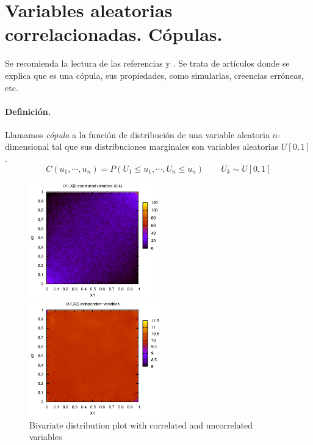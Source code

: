 \section{Variables aleatorias correlacionadas. C\'opulas.}

Se recomienda la lectura de las referencias \cite{copu:wang} y 
\cite{copu:pitfalls}. Se trata de art\'iculos donde se explica que es una 
c\'opula, sus propiedades, como simularlas, creencias err\'oneas, etc.

\paragraph{Definici\'on.} Llamamos \emph{c\'opula} a la funci\'on
de distribuci\'on de una variable aleatoria $n$-dimensional tal que sus distribuciones
marginales  son variables aleatorias $U[0,1]$.
\begin{displaymath}
C(u_1, \cdots,u_n)=P(U_1 \leq u_1, \cdots, U_n \leq u_n) \qquad U_k \sim U[0,1]
\end{displaymath}

\begin{figure}[!hb]
\begin{minipage}[c]{0.5\columnwidth}%
  \centering
  \includegraphics[height=5cm, angle=0]{./images/copula.eps}
\end{minipage}%
\hfill{}
\begin{minipage}[c]{0.5\columnwidth}%
  \centering
  \includegraphics[height=5cm, angle=0]{./images/uniform.eps}
\end{minipage}%
\caption{Bivariate distribution plot with correlated and uncorrelated variables}
\label{copulas}
\end{figure}

